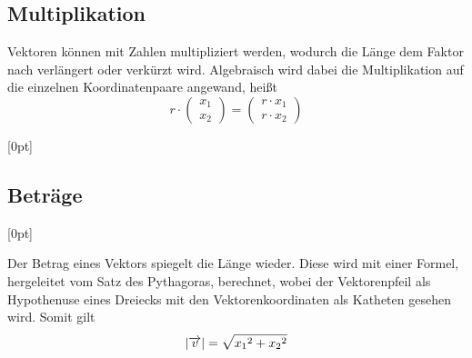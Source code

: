 \documentclass{article}
\begin{document}
\subsection{Multiplikation}
\begin{minipage}{\dimexpr\textwidth-4cm} 
Vektoren können mit Zahlen multipliziert werden, wodurch die Länge dem Faktor nach verlängert oder verkürzt wird. Algebraisch wird dabei die Multiplikation auf die einzelnen Koordinatenpaare angewand, heißt
\[ 
 r \cdot
 \begin{pmatrix} x_1 \\ x_2 \end{pmatrix} =
 \begin{pmatrix} r \cdot x_1 \\ r \cdot x_2 \end{pmatrix} 
\]
\end{minipage}
\hfill
\begin{minipage}{4cm}
  \centering
  \raisebox{-2cm}[0pt]{
  } 
 
\end{minipage} 
 
\subsection{Beträge}
\begin{minipage}{4cm}
  \centering
  \raisebox{-1.7cm}[0pt]{
  }
\end{minipage}
\hfill
\begin{minipage}{\dimexpr\textwidth-4cm}  
Der Betrag eines Vektors spiegelt die Länge wieder. Diese wird mit einer Formel, hergeleitet vom Satz des Pythagoras, berechnet, wobei der Vektorenpfeil als Hypothenuse eines Dreiecks mit den Vektorenkoordinaten als Katheten gesehen wird. Somit gilt
\[
 \left| {\overrightarrow{v}} \right| =
 \sqrt{{x_1}^2 + {x_2}^2}
\]
\end{minipage}
 
\end{document}
